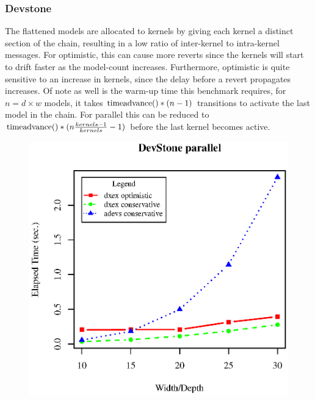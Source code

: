 \subsubsection{Devstone}
The flattened models are allocated to kernels by giving each kernel a distinct section of the chain, resulting in a low ratio of inter-kernel to intra-kernel messages. For optimistic, this can cause more reverts since the kernels will start to drift faster as the model-count increases. Furthermore, optimistic is quite sensitive to an increase in kernels, since the delay before a revert propagates increases. Of note as well is the warm-up time this benchmark requires, for $n=d\times w$ models, it takes $\textup{timeadvance}()*(n-1)$ transitions to activate the last model in the chain. For parallel this can be reduced to $\textup{timeadvance}()*(n\frac{kernels-1}{kernels} -1)$ before the last kernel becomes active.\\
\begin{figure}[ltbh]
	\includegraphics[width=.5\textwidth]{fig/fig2.eps}
	\label{fig2.eps}
\end{figure}
